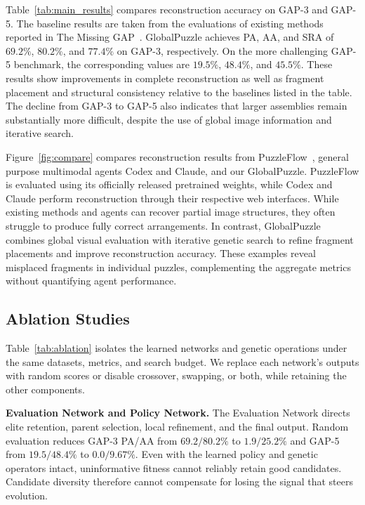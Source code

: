 \documentclass[10pt,twocolumn,letterpaper]{article}
\begin{document}
Table~\ref{tab:main_results} compares reconstruction accuracy on GAP-3 and GAP-5. The baseline results are taken from the evaluations of existing methods reported in The Missing GAP~\cite{shahar2026gap}. GlobalPuzzle achieves PA, AA, and SRA of $69.2\%$, $80.2\%$, and $77.4\%$ on GAP-3, respectively. On the more challenging GAP-5 benchmark, the corresponding values are $19.5\%$, $48.4\%$, and $45.5\%$. These results show improvements in complete reconstruction as well as fragment placement and structural consistency relative to the baselines listed in the table. The decline from GAP-3 to GAP-5 also indicates that larger assemblies remain substantially more difficult, despite the use of global image information and iterative search.

Figure~\ref{fig:compare} compares reconstruction results from PuzzleFlow~\cite{shahar2026gap}, general purpose multimodal agents Codex and Claude, and our GlobalPuzzle. PuzzleFlow is evaluated using its officially released pretrained weights, while Codex and Claude perform reconstruction through their respective web interfaces. While existing methods and agents can recover partial image structures, they often struggle to produce fully correct arrangements. In contrast, GlobalPuzzle combines global visual evaluation with iterative genetic search to refine fragment placements and improve reconstruction accuracy. These examples reveal misplaced fragments in individual puzzles, complementing the aggregate metrics without quantifying agent performance.



\subsection{Ablation Studies}
\label{sec:exp-ablation}

Table~\ref{tab:ablation} isolates the learned networks and genetic operations under the same datasets, metrics, and search budget. We replace each network's outputs with random scores or disable crossover, swapping, or both, while retaining the other components.

\noindent
\textbf{Evaluation Network and Policy Network.}
The Evaluation Network directs elite retention, parent selection, local refinement, and the final output. Random evaluation reduces GAP-3 PA/AA from $69.2/80.2\%$ to $1.9/25.2\%$ and GAP-5 from $19.5/48.4\%$ to $0.0/9.67\%$. Even with the learned policy and genetic operators intact, uninformative fitness cannot reliably retain good candidates. Candidate diversity therefore cannot compensate for losing the signal that steers evolution.
\end{document}
